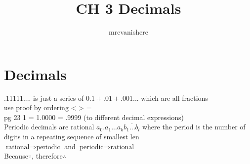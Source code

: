 \documentclass[12]{article}
\begin{document}
\title{CH 3 Decimals}
\author{mrevanishere}
\maketitle

\section{Decimals}
	\par
	.11111.... is just a series of $ 0.1 + .01 + .001 ... $ which are
	all fractions \\
	use proof by ordering < > = \\
	pg 23 1 = 1.0000 = .9999 (to different decimal expressions) \\
	Periodic decimals are rational
	$ a_0.a_1...a_k\overline{b_1...b_l} $ where the period is the number of
	digits in a repeating sequence of smallest len\\
	$ \text{rational} \Rightarrow \text{periodic} $
	and $ \text{periodic} \Rightarrow \text{rational} $ \\
	Because$ \because $, therefore$ \therefore $

		
\end{document}

